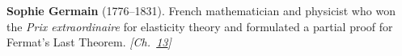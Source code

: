 \textbf{Sophie Germain} (1776–1831). French mathematician and physicist who won the \emph{Prix extraordinaire} for elasticity theory and formulated a partial proof for Fermat's Last Theorem. \emph{[Ch.~\hyperref[ch:poissonsspot]{13}]}

